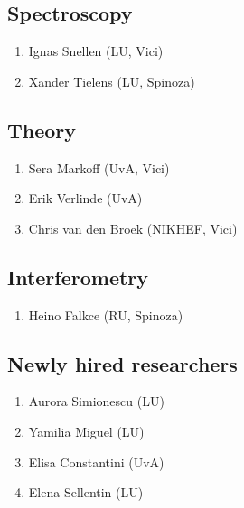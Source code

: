 \documentclass{article}
\begin{document}
\subsection{Spectroscopy}
\begin{enumerate}
    \item Ignas Snellen (LU, Vici)
    \item Xander Tielens (LU, Spinoza)
\end{enumerate}

\subsection{Theory}
\begin{enumerate}
    \item Sera Markoff (UvA, Vici)
    \item Erik Verlinde (UvA)
    \item Chris van den Broek (NIKHEF, Vici)
\end{enumerate}

\subsection{Interferometry}
\begin{enumerate}
    \item Heino Falkce (RU, Spinoza)
\end{enumerate}

\subsection{Newly hired researchers}
\begin{enumerate}
    \item Aurora Simionescu (LU)
    \item Yamilia Miguel (LU)
    \item Elisa Constantini (UvA)
    \item Elena Sellentin (LU)
\end{enumerate}
\end{document}
